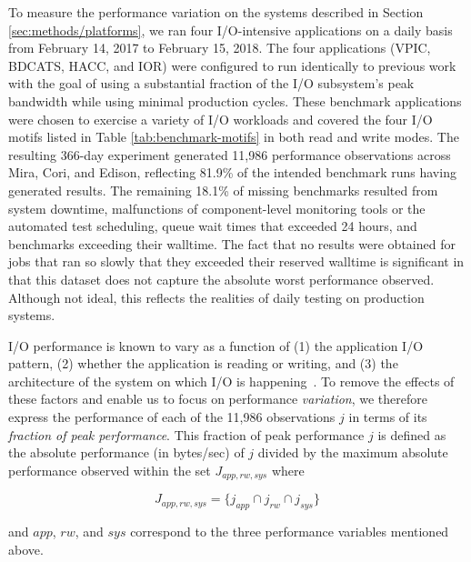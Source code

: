 To measure the performance variation on the systems described in Section \ref{sec:methods/platforms}, we ran four I/O-intensive applications on a daily basis from February 14, 2017 to February 15, 2018.
The four applications (VPIC, BDCATS, HACC, and IOR) were configured to run identically to previous work~\cite{Lockwood2017} with the goal of using a substantial fraction of the I/O subsystem's peak bandwidth while using minimal production cycles.
These benchmark applications were chosen to exercise a variety of I/O workloads and covered the four I/O motifs listed in Table \ref{tab:benchmark-motifs} in both read and write modes.
The resulting 366-day experiment generated 11,986 performance observations across Mira, Cori, and Edison, reflecting 81.9\% of the intended benchmark runs having generated results.
The remaining 18.1\% of missing benchmarks resulted from system downtime, malfunctions of component-level monitoring tools or the automated test scheduling, queue wait times that exceeded 24 hours, and benchmarks exceeding their walltime.
The fact that no results were obtained for jobs that ran so slowly that they exceeded their reserved walltime is significant in that this dataset does not capture the absolute worst performance observed.
Although not ideal, this reflects the realities of daily testing on production systems.


I/O performance is known to vary as a function of (1) the application I/O pattern, (2) whether the application is reading or writing, and (3) the architecture of the system on which I/O is happening~\cite{Lockwood2017}.
To remove the effects of these factors and enable us to focus on performance \emph{variation}, we therefore express the performance of each of the 11,986 observations $j$ in terms of its \emph{fraction of peak performance}.
This fraction of peak performance $j$ is defined as the absolute performance (in bytes/sec) of $j$ divided by the maximum absolute performance observed within the set $J_{app, rw, sys}$ where

\begin{equation}
J_{app, rw, sys} = \big\{ j_{app} \cap j_{rw} \cap j_{sys} \big \}
\end{equation}

\noindent
and $app$, $rw$, and $sys$ correspond to the three performance variables mentioned above.

